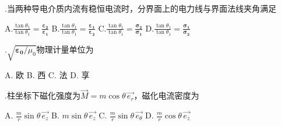 \vspace{0.3cm}

.\hspace{0.8em}当两种导电介质内流有稳恒电流时，分界面上的电力线与界面法线夹角满足
\vspace{0.3cm}

A.\hspace{0.8em}$\displaystyle{\frac{\tan \theta_1}{\tan \theta_1} = \frac{\boldsymbol{\varepsilon_2}}{\boldsymbol{\varepsilon_1}}}$ \hspace{2em} B.\hspace{0.8em}$\displaystyle{\frac{\tan \theta_1}{\tan \theta_1} = \frac{\boldsymbol{\varepsilon_1}}{\boldsymbol{\varepsilon_2}}}$ \hspace{2em} C.\hspace{0.8em}$\displaystyle{\frac{\tan \theta_1}{\tan \theta_1} = \frac{\boldsymbol{\sigma_2}}{\boldsymbol{\sigma_1}}}$ \hspace{2em} D.\hspace{0.8em}$\displaystyle{\frac{\tan \theta_1}{\tan \theta_1} = \frac{\boldsymbol{\sigma_1}}{\boldsymbol{\sigma_2}}}$ 
\vspace{0.3cm}

.\hspace{0.8em}$\sqrt{\boldsymbol{\varepsilon_0} / \mu_0}$物理计量单位为
\vspace{0.2cm}

A.\hspace{0.8em} 欧\hspace{2em}
B.\hspace{0.8em} 西\hspace{2em}
C.\hspace{0.8em} 法\hspace{2em}
D.\hspace{0.8em} 享
\vspace{0.2cm}

.\hspace{0.8em}柱坐标下磁化强度为$\Vec{M} = m \cos \theta \, \Vec{e_r}$，磁化电流密度为
\vspace{0.3cm}

A.\hspace{0.8em} $\displaystyle{ \frac{m}{r} \sin \theta \, \Vec{e_z} }$\hspace{2em}
B.\hspace{0.8em} $ m \sin \theta \,  \Vec{e_z} $\hspace{2em}
C.\hspace{0.8em} $\displaystyle{ \frac{m}{r} \sin \theta \, \Vec{e_{\theta}} }$\hspace{2em}
D.\hspace{0.8em} $\displaystyle{ \frac{m}{r} \cos \theta \, \Vec{e_z} }$
\vspace{0.3cm}

